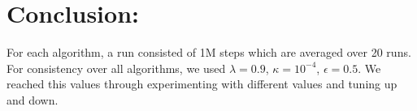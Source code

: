 \documentclass[a4paper,10pt]{article}
\begin{document}
\section{Conclusion:}
For each algorithm, a run consisted of 1M steps which are averaged over 20 runs. For consistency over all algorithms, we used $\lambda=0.9$, $\kappa=10^{-4}$, $\epsilon=0.5$. We reached this values through experimenting with different values and tuning up and down. 

   
   
 
\medskip


\end{document}

